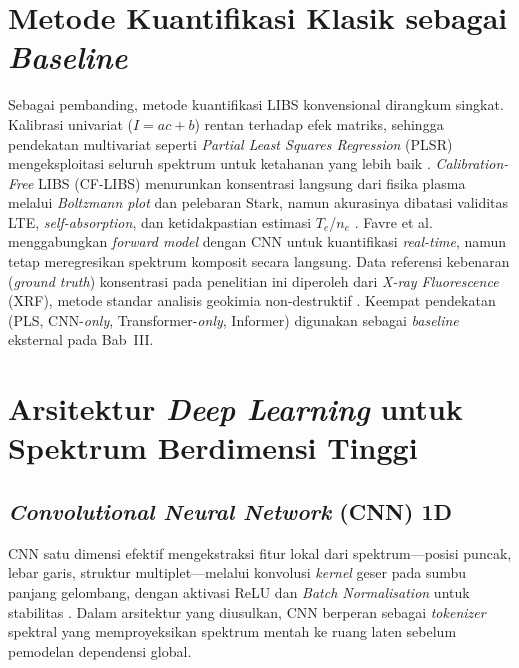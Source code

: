 \section{Metode Kuantifikasi Klasik sebagai \textit{Baseline}}

Sebagai pembanding, metode kuantifikasi LIBS konvensional dirangkum singkat. Kalibrasi univariat ($I = a c + b$) rentan terhadap efek matriks, sehingga pendekatan multivariat seperti \textit{Partial Least Squares Regression} (PLSR) mengeksploitasi seluruh spektrum untuk ketahanan yang lebih baik \citep{safi_multivariate_2018, zhang_partial_2020, wold_pls_2001}. \textit{Calibration-Free} LIBS (CF-LIBS) menurunkan konsentrasi langsung dari fisika plasma melalui \textit{Boltzmann plot} dan pelebaran Stark, namun akurasinya dibatasi validitas LTE, \textit{self-absorption}, dan ketidakpastian estimasi $T_e$/$n_e$ \citep{cristoforetti_local_2010, yang_self-absorption_2020, zeng_accurate_2023}. Favre et al.\ \citep{favre_towards_2025} menggabungkan \textit{forward model} dengan CNN untuk kuantifikasi \textit{real-time}, namun tetap meregresikan spektrum komposit secara langsung. Data referensi kebenaran (\textit{ground truth}) konsentrasi pada penelitian ini diperoleh dari \textit{X-ray Fluorescence} (XRF), metode standar analisis geokimia non-destruktif \citep{yamasaki_major_2023, ravansari_portable_2019}. Keempat pendekatan (PLS, CNN-\textit{only}, Transformer-\textit{only}, Informer) digunakan sebagai \textit{baseline} eksternal pada Bab~III.

\section{Arsitektur \textit{Deep Learning} untuk Spektrum Berdimensi Tinggi}

\subsection{\textit{Convolutional Neural Network} (CNN) 1D}
CNN satu dimensi efektif mengekstraksi fitur lokal dari spektrum---posisi puncak, lebar garis, struktur multiplet---melalui konvolusi \textit{kernel} geser pada sumbu panjang gelombang, dengan aktivasi ReLU dan \textit{Batch Normalisation} untuk stabilitas \citep{he_deep_2016, ioffe_batch_2015}. Dalam arsitektur yang diusulkan, CNN berperan sebagai \textit{tokenizer} spektral yang memproyeksikan spektrum mentah ke ruang laten sebelum pemodelan dependensi global.

